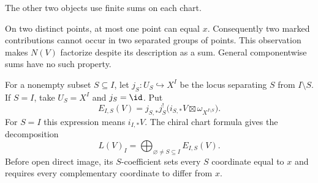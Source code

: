 The other two objects use finite sums on each chart.

On two distinct points, at most one point can equal $x$.
Consequently two marked contributions cannot occur in two separated
groups of points. This observation makes $N(V)$ factorize despite its
description as a sum. General componentwise sums have no such property.

For a nonempty subset $S\subseteq I$, let
$j_S:U_S\hookrightarrow X^I$ be the locus separating $S$ from
$I\setminus S$. If $S=I$, take $U_S=X^I$ and $j_S=\id$.
Put
\[
 E_{I,S}(V)=j_{S,*}j_S^!
 \bigl(i_{S,*}V\boxtimes\omega_{X^{I\setminus S}}\bigr).
\]
For $S=I$ this expression means $i_{I,*}V$.
The chiral chart formula gives the decomposition
\begin{equation}
 L(V)_I=\bigoplus_{\varnothing\ne S\subseteq I}E_{I,S}(V).
 \label{eq:cbc:two:marked-sum}
\end{equation}
Before open direct image, its $S$-coefficient sets every $S$ coordinate
equal to $x$ and requires every complementary coordinate to differ from $x$.

